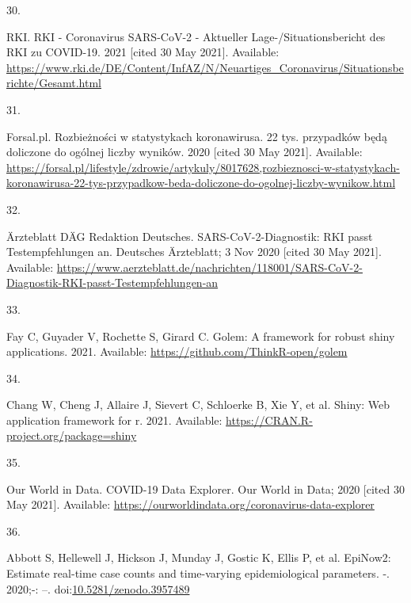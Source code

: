 \documentclass[10pt,letterpaper]{article}
\newlength{\cslhangindent}
\newlength{\csllabelwidth}
\newlength{\cslentryspacingunit} %
\newenvironment{CSLReferences}[2] %
 {%
  \setlength{\parindent}{0pt}
  \ifodd #1
  \let\oldpar\par
  \def\par{\hangindent=\cslhangindent\oldpar}
  \fi
  \setlength{\parskip}{#2\cslentryspacingunit}
 }%
 {}
\newcommand{\CSLLeftMargin}[1]{\parbox[t]{\csllabelwidth}{#1}}
\newcommand{\CSLRightInline}[1]{\parbox[t]{\linewidth - \csllabelwidth}{#1}\break}
\begin{document}
\begin{CSLReferences}{0}{0}
\leavevmode{}%
\CSLLeftMargin{30. }%
\CSLRightInline{RKI. {RKI} - {Coronavirus SARS-CoV-2} - {Aktueller
Lage-}/{Situationsbericht} des {RKI} zu {COVID-19}. 2021 {[}cited 30 May
2021{]}. Available:
\url{https://www.rki.de/DE/Content/InfAZ/N/Neuartiges_Coronavirus/Situationsberichte/Gesamt.html}}

\leavevmode{}%
\CSLLeftMargin{31. }%
\CSLRightInline{Forsal.pl. Rozbieżności w statystykach koronawirusa. 22
tys. przypadków będą doliczone do ogólnej liczby wyników. 2020 {[}cited
30 May 2021{]}. Available:
\url{https://forsal.pl/lifestyle/zdrowie/artykuly/8017628,rozbieznosci-w-statystykach-koronawirusa-22-tys-przypadkow-beda-doliczone-do-ogolnej-liczby-wynikow.html}}

\leavevmode{}%
\CSLLeftMargin{32. }%
\CSLRightInline{Ärzteblatt DÄG Redaktion Deutsches.
SARS-CoV-2-Diagnostik: RKI passt Testempfehlungen an. {Deutsches
Ärzteblatt}; 3 Nov 2020 {[}cited 30 May 2021{]}. Available:
\url{https://www.aerzteblatt.de/nachrichten/118001/SARS-CoV-2-Diagnostik-RKI-passt-Testempfehlungen-an}}

\leavevmode{}%
\CSLLeftMargin{33. }%
\CSLRightInline{Fay C, Guyader V, Rochette S, Girard C. Golem: A
framework for robust shiny applications. 2021. Available:
\url{https://github.com/ThinkR-open/golem}}

\leavevmode{}%
\CSLLeftMargin{34. }%
\CSLRightInline{Chang W, Cheng J, Allaire J, Sievert C, Schloerke B, Xie
Y, et al. Shiny: Web application framework for r. 2021. Available:
\url{https://CRAN.R-project.org/package=shiny}}

\leavevmode{}%
\CSLLeftMargin{35. }%
\CSLRightInline{Our World in Data. {COVID-19 Data Explorer}. {Our World
in Data}; 2020 {[}cited 30 May 2021{]}. Available:
\url{https://ourworldindata.org/coronavirus-data-explorer}}

\leavevmode{}%
\CSLLeftMargin{36. }%
\CSLRightInline{Abbott S, Hellewell J, Hickson J, Munday J, Gostic K,
Ellis P, et al. EpiNow2: Estimate real-time case counts and time-varying
epidemiological parameters. -. 2020;-: --.
doi:\href{https://doi.org/10.5281/zenodo.3957489}{10.5281/zenodo.3957489}}


\end{CSLReferences}
\end{document}

